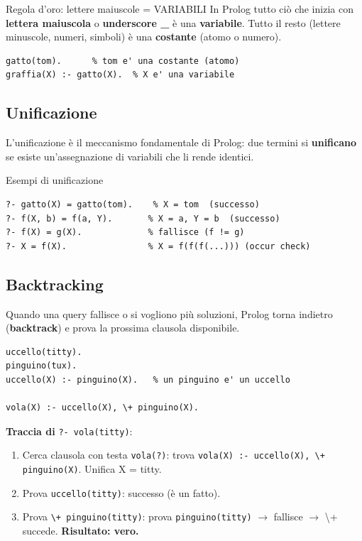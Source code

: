 \documentclass[12pt,a4paper]{article}
\begin{document}
\begin{keybox}{Regola d'oro: lettere maiuscole = VARIABILI}
In Prolog tutto ciò che inizia con \textbf{lettera maiuscola} o \textbf{underscore \_}
è una \textbf{variabile}. Tutto il resto (lettere minuscole, numeri, simboli) è
una \textbf{costante} (atomo o numero).
\begin{lstlisting}
gatto(tom).      % tom e' una costante (atomo)
graffia(X) :- gatto(X).  % X e' una variabile
\end{lstlisting}
\end{keybox}

\subsection{Unificazione}

L'unificazione è il meccanismo fondamentale di Prolog: due termini si
\textbf{unificano} se esiste un'assegnazione di variabili che li rende identici.

\begin{exbox}{Esempi di unificazione}
\begin{lstlisting}
?- gatto(X) = gatto(tom).    % X = tom  (successo)
?- f(X, b) = f(a, Y).       % X = a, Y = b  (successo)
?- f(X) = g(X).             % fallisce (f != g)
?- X = f(X).                % X = f(f(f(...))) (occur check)
\end{lstlisting}
\end{exbox}

\subsection{Backtracking}

Quando una query fallisce o si vogliono più soluzioni, Prolog torna indietro
(\textbf{backtrack}) e prova la prossima clausola disponibile.

\begin{lstlisting}
uccello(titty).
pinguino(tux).
uccello(X) :- pinguino(X).   % un pinguino e' un uccello

vola(X) :- uccello(X), \+ pinguino(X).
\end{lstlisting}

\textbf{Traccia di} \texttt{?- vola(titty)}:
\begin{enumerate}[noitemsep]
  \item Cerca clausola con testa \texttt{vola(?)}: trova \texttt{vola(X) :- uccello(X), \textbackslash+ pinguino(X)}. Unifica X = titty.
  \item Prova \texttt{uccello(titty)}: successo (è un fatto).
  \item Prova \texttt{\textbackslash+ pinguino(titty)}: prova \texttt{pinguino(titty)} $\to$ fallisce $\to$ \textbackslash+ succede. \textbf{Risultato: vero.}
\end{enumerate}
\end{document}
